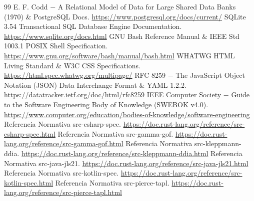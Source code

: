 \documentclass{book}
\begin{document}
\begin{thebibliography}{99}
 E. F. Codd \(-\) A Relational Model of Data for Large Shared Data Banks (1970) \& PostgreSQL Docs. \url{https://www.postgresql.org/docs/current/}
 SQLite 3.54 Transactional SQL Database Engine Documentation. \url{https://www.sqlite.org/docs.html}
 GNU Bash Reference Manual \& IEEE Std 1003.1 POSIX Shell Specification. \url{https://www.gnu.org/software/bash/manual/bash.html}
 WHATWG HTML Living Standard \& W3C CSS Specifications. \url{https://html.spec.whatwg.org/multipage/}
 RFC 8259 \(-\) The JavaScript Object Notation (JSON) Data Interchange Format \& YAML 1.2.2. \url{https://datatracker.ietf.org/doc/html/rfc8259}
 IEEE Computer Society \(-\) Guide to the Software Engineering Body of Knowledge (SWEBOK v4.0). \url{https://www.computer.org/education/bodies-of-knowledge/software-engineering}
 Referencia Normativa src-csharp-spec. \url{https://doc.rust-lang.org/reference/src-csharp-spec.html}
 Referencia Normativa src-gamma-gof. \url{https://doc.rust-lang.org/reference/src-gamma-gof.html}
 Referencia Normativa src-kleppmann-ddia. \url{https://doc.rust-lang.org/reference/src-kleppmann-ddia.html}
 Referencia Normativa src-java-jls21. \url{https://doc.rust-lang.org/reference/src-java-jls21.html}
 Referencia Normativa src-kotlin-spec. \url{https://doc.rust-lang.org/reference/src-kotlin-spec.html}
 Referencia Normativa src-pierce-tapl. \url{https://doc.rust-lang.org/reference/src-pierce-tapl.html}
\end{thebibliography}
\end{document}
